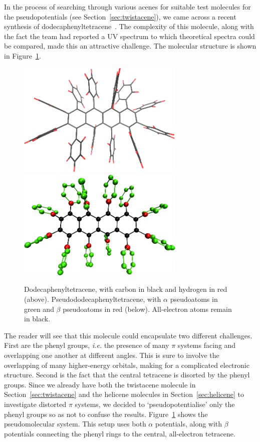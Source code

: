 \documentclass[aip,reprint,nofootinbib]{revtex4-1}
\begin{document}
In the process of searching through various acenes for suitable test molecules for the pseudopotentials (see Section~\ref{sec:twistacene}), we came across a recent synthesis of dodecaphenyltetracene~\cite{xiao_2019}. The complexity of this molecule, along with the fact the team had reported a UV spectrum to which theoretical spectra could be compared, made this an attractive challenge. The molecular structure is shown in Figure~\ref{fig:dodecaphenyltetracene}.

\begin{figure}
\begin{center}
\includegraphics[width=8cm]{dodecaphenyltetracene}
\includegraphics[width=8cm]{cc_psdodeca}
\caption[Dodecaphenyltetracene structure diagram.]{Dodecaphenyltetracene, with carbon in black and hydrogen in red (above). Pseudododecaphenyltetracene, with $\alpha$ pseudoatoms in green and $\beta$ pseudoatoms in red (below). All-electron atoms remain in black.}\label{fig:dodecaphenyltetracene}
\end{center}
\end{figure}

The reader will see that this molecule could encapsulate two different challenges. First are the phenyl groups, \emph{i.e.} the presence of many $\pi$ systems facing and overlapping one another at different angles. This is sure to involve the overlapping of many higher-energy orbitals, making for a complicated electronic structure. Second is the fact that the central tetracene is disorted by the phenyl groups. Since we already have both the twistacene  molecule in Section~\ref{sec:twistacene} and the helicene molecules in Section~\ref{sec:helicene} to investigate distorted $\pi$ systems, we decided to `pseudopotentialise' only the phenyl groups so as not to confuse the results. Figure~\ref{fig:dodecaphenyltetracene} shows the pseudomolecular system. This setup uses both $\alpha$ potentials, along with $\beta$ potentials connecting the phenyl rings to the central, all-electron tetracene.
\end{document}
